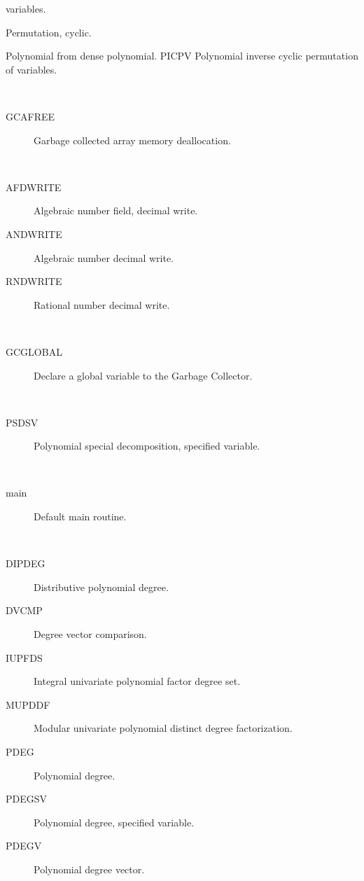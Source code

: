 \begin{description}
\begin{description}
    variables.
  \item[PERMCY]  Permutation, cyclic.
  \item[PFDP]  Polynomial from dense polynomial. PICPV Polynomial inverse
    cyclic permutation of variables.
  \end{description}
\item[deallocation] \ \ 
  \begin{description}
  \item[GCAFREE]  Garbage collected array memory deallocation.
  \end{description}
\item[decimal] \ \ 
  \begin{description}
  \item[AFDWRITE]  Algebraic number field, decimal write.
  \item[ANDWRITE]  Algebraic number decimal write.
  \item[RNDWRITE]  Rational number decimal write.
  \end{description}
\item[declare] \ \ 
  \begin{description}
  \item[GCGLOBAL]  Declare a global variable to the Garbage Collector.
  \end{description}
\item[decomposition] \ \ 
  \begin{description}
  \item[PSDSV]  Polynomial special decomposition, specified variable.
  \end{description}
\item[default] \ \ 
  \begin{description}
  \item[main]  Default main routine.
  \end{description}
\item[degree] \ \ 
  \begin{description}
  \item[DIPDEG]  Distributive polynomial degree.
  \item[DVCMP]  Degree vector comparison.
  \item[IUPFDS]  Integral univariate polynomial factor degree set.
  \item[MUPDDF]  Modular univariate polynomial distinct degree factorization.
  \item[PDEG]  Polynomial degree.
  \item[PDEGSV]  Polynomial degree, specified variable.
  \item[PDEGV]  Polynomial degree vector.

\end{description}
\end{description}
